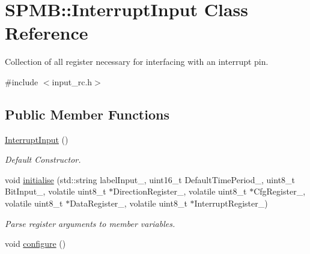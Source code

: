 \hypertarget{classSPMB_1_1InterruptInput}{}\section{S\+P\+MB\+:\+:Interrupt\+Input Class Reference}
\label{classSPMB_1_1InterruptInput}


Collection of all register necessary for interfacing with an interrupt pin.  




{\ttfamily \#include $<$input\+\_\+rc.\+h$>$}

\subsection*{Public Member Functions}
\begin{DoxyCompactItemize}
\item 
\hyperlink{classSPMB_1_1InterruptInput_a1d7054c59edcd2989088eda0d6615370}{Interrupt\+Input} ()\hypertarget{classSPMB_1_1InterruptInput_a1d7054c59edcd2989088eda0d6615370}{}\label{classSPMB_1_1InterruptInput_a1d7054c59edcd2989088eda0d6615370}

\begin{DoxyCompactList}\small\item\em Default Constructor. \end{DoxyCompactList}\item 
void \hyperlink{classSPMB_1_1InterruptInput_a537b9601886237322cd01b4d66a1cae3}{initialise} (std\+::string label\+Input\+\_\+, uint16\+\_\+t Default\+Time\+Period\+\_\+, uint8\+\_\+t Bit\+Input\+\_\+, volatile uint8\+\_\+t $\ast$Direction\+Register\+\_\+, volatile uint8\+\_\+t $\ast$Cfg\+Register\+\_\+, volatile uint8\+\_\+t $\ast$Data\+Register\+\_\+, volatile uint8\+\_\+t $\ast$Interrupt\+Register\+\_\+)\hypertarget{classSPMB_1_1InterruptInput_a537b9601886237322cd01b4d66a1cae3}{}\label{classSPMB_1_1InterruptInput_a537b9601886237322cd01b4d66a1cae3}

\begin{DoxyCompactList}\small\item\em Parse register arguments to member variables. \end{DoxyCompactList}\item 
void \hyperlink{classSPMB_1_1InterruptInput_af458652456481ec1ee7af3381f4df732}{configure} ()\hypertarget{classSPMB_1_1InterruptInput_af458652456481ec1ee7af3381f4df732}{}\label{classSPMB_1_1InterruptInput_af458652456481ec1ee7af3381f4df732}


\end{DoxyCompactItemize}
